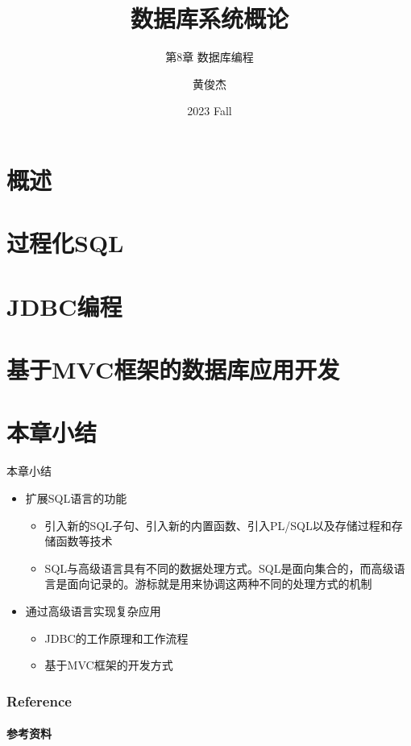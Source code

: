 \documentclass[t]{sintefbeamer}
\title{数据库系统概论}
\subtitle{第8章 数据库编程}
\author{黄俊杰}
\date{2023 Fall}
\begin{document}

\maketitle


\section{概述}


\section{过程化SQL}


\section{JDBC编程}


\section{基于MVC框架的数据库应用开发}



\section{本章小结}
\begin{frame}{本章小结}
\begin{itemize}
    \item 扩展SQL语言的功能
    \begin{itemize}
        \item 引入新的SQL子句、引入新的内置函数、引入PL/SQL以及存储过程和存储函数等技术
        \item SQL与高级语言具有不同的数据处理方式。SQL是面向集合的，而高级语言是面向记录的。游标就是用来协调这两种不同的处理方式的机制
    \end{itemize}


    \item 通过高级语言实现复杂应用
    \begin{itemize}
        \item JDBC的工作原理和工作流程
        \item 基于MVC框架的开发方式
    \end{itemize}


\end{itemize}
    
\end{frame}

\backmatter

\begin{frame}[t]
\frametitle{Reference}
\framesubtitle{参考资料}
\nocite{*}

\end{frame}
\end{document}
